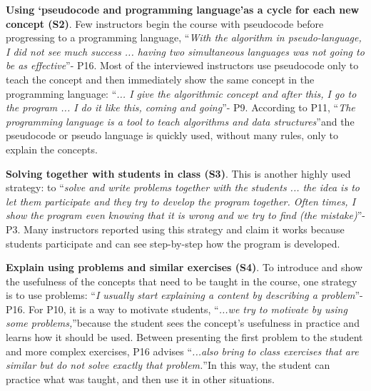 \documentclass[sigconf]{acmart}
\begin{document}
\textbf{Using \textquoteleft{pseudocode and programming language}\textquoteright \space as a cycle for each new concept (S2)}. Few instructors begin the course with pseudocode before progressing to a programming language, \textquotedblleft \textit{With the algorithm in pseudo-language, I did not see much success ... having two simultaneous languages was not going to be as effective}\textquotedblright \space - P16. Most of the interviewed instructors use pseudocode only to teach the concept and then immediately show the same concept in the programming language: \textquotedblleft \textit{... I give the algorithmic concept and after this, I go to the program ... I do it like this, coming and going}\textquotedblright \space - P9. According to P11, \textquotedblleft \textit{The programming language is a tool to teach algorithms and data structures}\textquotedblright \space and the pseudocode or pseudo language is quickly used, without many rules, only to explain the concepts.

\textbf{Solving together with students in class (S3)}. This is another highly used strategy: to \textquotedblleft \textit{solve and write problems together with the students ... the idea is to let them participate and they try to develop the program together. Often times, I show the program even knowing that it is wrong and we try to find (the mistake)}\textquotedblright \space - P3. Many instructors reported using this strategy and claim it works because students participate and can see step-by-step how the program is developed.

\textbf{Explain using problems and similar exercises (S4)}. To introduce and show the usefulness of the concepts that need to be taught in the course, one strategy is to use problems: \textquotedblleft \textit{I usually start explaining a content by describing a problem}\textquotedblright \space - P16. For P10, it is a way to motivate students, \textquotedblleft \textit{...we try to motivate by using some problems,}\textquotedblright \space because the student sees the concept\textquoteright s usefulness in practice and learns how it should be used. Between presenting the first problem to the student and more complex exercises, P16 advises \textquotedblleft \textit{...also bring to class exercises that are similar but do not solve exactly that problem.}\textquotedblright \space In this way, the student can practice what was taught, and then use it in other situations.
\end{document}
